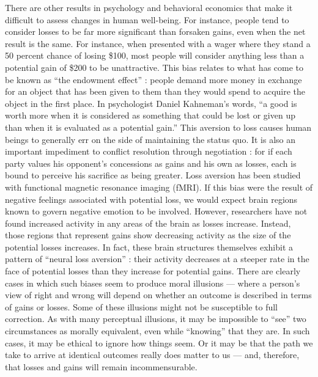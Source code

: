 \documentclass[a4paper,14pt]{extarticle}
\begin{document}
There are other results in psychology and behavioral economics that make it difficult to assess changes in human well-being.
For instance, people tend to consider losses to be far more significant than forsaken gains, even when the net result is the same.
For instance, when presented with a wager where they stand a 50 percent chance of losing \$100, most people will consider anything less than a potential gain of \$200 to be unattractive.
This bias relates to what has come to be known as ``the endowment effect'' :
people demand more money in exchange for an object that has been given to them than they would spend to acquire the object in the first place.
In psychologist Daniel Kahneman's words, ``a good is worth more when it is considered as something that could be lost or given up than when it is evaluated as a potential gain.''
This aversion to loss causes human beings to generally err on the side of maintaining the status quo.
It is also an important impediment to conflict resolution through negotiation :
for if each party values his opponent's concessions as gains and his own as losses, each is bound to perceive his sacrifice as being greater.
Loss aversion has been studied with functional magnetic resonance imaging (fMRI).
If this bias were the result of negative feelings associated with potential loss, we would expect brain regions known to govern negative emotion to be involved.
However, researchers have not found increased activity in any areas of the brain as losses increase.
Instead, those regions that represent gains show decreasing activity as the size of the potential losses increases.
In fact, these brain structures themselves exhibit a pattern of ``neural loss aversion'' :
their activity decreases at a steeper rate in the face of potential losses than they increase for potential gains.
There are clearly cases in which such biases seem to produce moral illusions --- where a person's view of right and wrong will depend on whether an outcome is described in terms of gains or losses.
Some of these illusions might not be susceptible to full correction.
As with many perceptual illusions, it may be impossible to ``see'' two circumstances as morally equivalent, even while ``knowing'' that they are.
In such cases, it may be ethical to ignore how things seem.
Or it may be that the path we take to arrive at identical outcomes really does matter to us --- and, therefore, that losses and gains will remain incommensurable.
\end{document}
